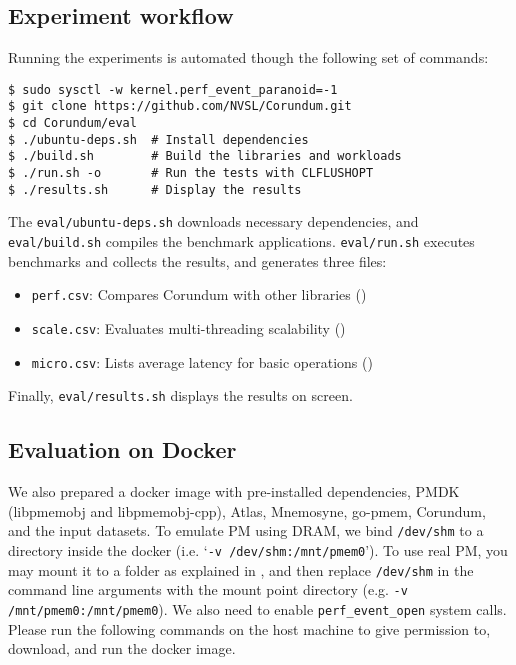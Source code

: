 {%
\subsection{Experiment workflow}

Running the experiments is automated though the following set of commands:

\begin{verbatim}
$ sudo sysctl -w kernel.perf_event_paranoid=-1
$ git clone https://github.com/NVSL/Corundum.git
$ cd Corundum/eval
$ ./ubuntu-deps.sh  # Install dependencies
$ ./build.sh        # Build the libraries and workloads
$ ./run.sh -o       # Run the tests with CLFLUSHOPT
$ ./results.sh      # Display the results
\end{verbatim}

The \verb+eval/ubuntu-deps.sh+ downloads necessary dependencies, and \verb+eval/build.sh+ compiles the benchmark applications.
\verb+eval/run.sh+ executes benchmarks and collects the results, and generates three files:

\begin{itemize}
  \item \verb+perf.csv+: Compares Corundum with other libraries ()
  \item \verb+scale.csv+: Evaluates multi-threading scalability ()
  \item \verb+micro.csv+: Lists average latency for basic operations ()
\end{itemize}

\noindent Finally, \verb+eval/results.sh+ displays the results on screen.


\subsection{Evaluation on Docker}

We also prepared a docker image with pre-installed dependencies, PMDK (libpmemobj and libpmemobj-cpp), Atlas, Mnemosyne, go-pmem, Corundum, and the input datasets. To emulate PM using DRAM, we bind \verb+/dev/shm+ to a directory inside the docker (i.e. `\verb+-v /dev/shm:/mnt/pmem0+'). To use real PM, you may mount it to a folder as explained in , and then replace \verb+/dev/shm+ in the command line arguments with the mount point directory (e.g. \verb+-v /mnt/pmem0:/mnt/pmem0+). We also need to enable \verb+perf_event_open+ system calls. Please run the following commands on the host machine to give permission to, download, and run the docker image.


}
